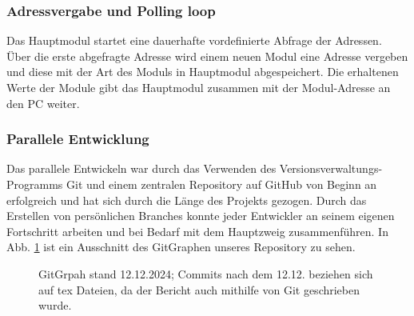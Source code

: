 \subsubsection{Adressvergabe und Polling loop}
Das Hauptmodul startet eine dauerhafte vordefinierte Abfrage der Adressen. Über die erste abgefragte Adresse wird einem neuen Modul eine Adresse vergeben und diese mit der Art des Moduls in Hauptmodul abgespeichert. Die erhaltenen Werte der Module gibt das Hauptmodul zusammen mit der Modul-Adresse an den PC weiter.

\subsubsection{Parallele Entwicklung}
Das parallele Entwickeln war durch das Verwenden des Versionsverwaltungs-Programms \glqq Git\grqq{} und einem zentralen Repository auf \glqq GitHub\grqq{} von Beginn an erfolgreich und hat sich durch die Länge des Projekts gezogen. Durch das Erstellen von persönlichen \glqq Branches\grqq{} konnte jeder Entwickler an seinem eigenen Fortschritt arbeiten und bei Bedarf mit dem Hauptzweig zusammenführen. In Abb. \ref{gitgraph} ist ein Ausschnitt des GitGraphen unseres Repository zu sehen.

\begin{figure}[H]
    \centering    
    \caption{GitGrpah stand 12.12.2024; Commits nach dem 12.12. beziehen sich auf tex Dateien, da der Bericht auch mithilfe von Git geschrieben wurde.}
    \label{gitgraph}
\end{figure}

